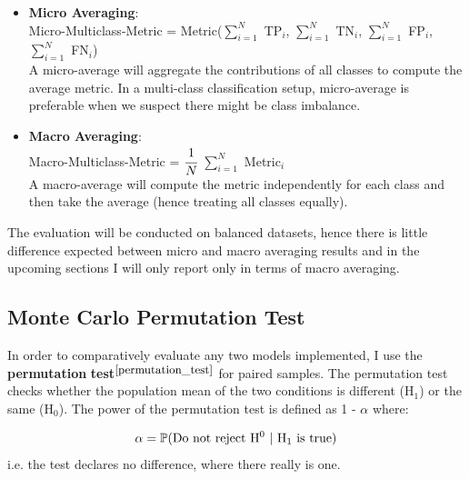 \begin{itemize}
  \item \textbf{Micro Averaging}: \\
        Micro-Multiclass-Metric = Metric($\sum_{i=1}^{N}$ TP$_i$, $\sum_{i=1}^{N}$ TN$_i$, $\sum_{i=1}^{N}$ FP$_i$, $\sum_{i=1}^{N}$ FN$_i$) \\
        A micro-average will aggregate the contributions of all classes to compute the average metric. In a multi-class classification setup, micro-average is preferable when we suspect there might be class imbalance.

  \item \textbf{Macro Averaging}: \\
        Macro-Multiclass-Metric = $\cfrac{1}{N}$ $\sum_{i=1}^{N}$ Metric$_i$ \\
        A macro-average will compute the metric independently for each class and then take the average (hence treating all classes equally).
\end{itemize}

The evaluation will be conducted on balanced datasets, hence there is little difference expected between micro and macro averaging results and in the upcoming sections I will only report only in terms of macro averaging. \\


\subsection{Monte Carlo Permutation Test}

In order to comparatively evaluate any two models implemented, I use the \textbf{permutation} \textbf{test}$^{\small \cite{permutation_test}}$ for paired samples. The permutation test checks whether the population mean of the two conditions is different (H$_1$) or the same (H$_0$). The power of the permutation test is defined as 1 - $\alpha$ where:

\begin{equation}
  \centering
  \alpha = \mathbb{P}(\text{Do not reject H$^0$ | H$_1$ is true}) \newline
\end{equation}
i.e. the test declares no difference, where there really is one. \\

